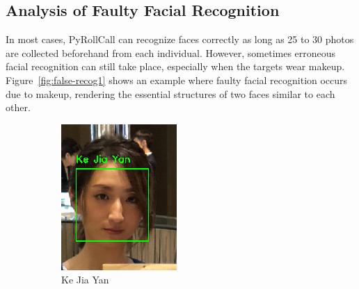 \subsection{Analysis of Faulty Facial Recognition}
In most cases, PyRollCall can recognize faces correctly as long as 25 to 30 photos are collected
beforehand from each individual. However, sometimes erroneous facial recognition can still take place,
especially when the targets wear makeup. Figure~\ref{fig:false-recog1} shows an example where
faulty facial recognition occurs due to makeup, rendering the essential structures of two faces
similar to each other.
\vspace{0.2cm}

\begin{figure}[!htb]
  \centering
  \begin{subfigure}[b]{0.3\linewidth}
    \includegraphics[width=\linewidth]{figures/false-recog-correct1.png}
    \caption{Ke Jia Yan}
  \end{subfigure}
  \begin{subfigure}[b]{0.3\linewidth}

\end{subfigure}
\end{figure}
